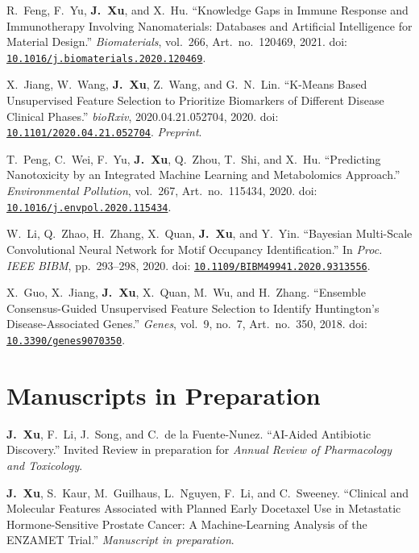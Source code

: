 \documentclass[10pt,a4paper]{article}
\begin{document}
\begin{enumerate}[label={[\arabic*]}, before={\interlinepenalty=10000}]
\item
R.~Feng, F.~Yu, \textbf{J.~Xu}, and X.~Hu.
``Knowledge Gaps in Immune Response and Immunotherapy Involving Nanomaterials: Databases and Artificial Intelligence for Material Design.''
\textit{Biomaterials}, vol.~266, Art.~no.~120469, 2021.
doi: \href{https://doi.org/10.1016/j.biomaterials.2020.120469}{\nolinkurl{10.1016/j.biomaterials.2020.120469}}.

\item
X.~Jiang, W.~Wang, \textbf{J.~Xu}, Z.~Wang, and G.~N.~Lin.
``K-Means Based Unsupervised Feature Selection to Prioritize Biomarkers of Different Disease Clinical Phases.''
\textit{bioRxiv}, 2020.04.21.052704, 2020.
doi: \href{https://doi.org/10.1101/2020.04.21.052704}{\nolinkurl{10.1101/2020.04.21.052704}}. \textit{Preprint}.

\item
T.~Peng, C.~Wei, F.~Yu, \textbf{J.~Xu}, Q.~Zhou, T.~Shi, and X.~Hu.
``Predicting Nanotoxicity by an Integrated Machine Learning and Metabolomics Approach.''
\textit{Environmental Pollution}, vol.~267, Art.~no.~115434, 2020.
doi: \href{https://doi.org/10.1016/j.envpol.2020.115434}{\nolinkurl{10.1016/j.envpol.2020.115434}}.

\item
W.~Li, Q.~Zhao, H.~Zhang, X.~Quan, \textbf{J.~Xu}, and Y.~Yin.
``Bayesian Multi-Scale Convolutional Neural Network for Motif Occupancy Identification.''
In \textit{Proc. IEEE BIBM}, pp.~293--298, 2020.
doi: \href{https://doi.org/10.1109/BIBM49941.2020.9313556}{\nolinkurl{10.1109/BIBM49941.2020.9313556}}.

\item
X.~Guo, X.~Jiang, \textbf{J.~Xu}, X.~Quan, M.~Wu, and H.~Zhang.
``Ensemble Consensus-Guided Unsupervised Feature Selection to Identify Huntington's Disease-Associated Genes.''
\textit{Genes}, vol.~9, no.~7, Art.~no.~350, 2018.
doi: \href{https://doi.org/10.3390/genes9070350}{\nolinkurl{10.3390/genes9070350}}.

\end{enumerate}

\section{Manuscripts in Preparation}
\begin{enumerate}[label={[\arabic*]}, before={\interlinepenalty=10000}]

\item
\textbf{J.~Xu}, F.~Li, J.~Song, and C.~de la Fuente-Nunez.
``AI-Aided Antibiotic Discovery.''
Invited Review in preparation for \textit{Annual Review of Pharmacology and Toxicology}.

\item
\textbf{J.~Xu}, S.~Kaur, M.~Guilhaus, L.~Nguyen, F.~Li, and C.~Sweeney.
``Clinical and Molecular Features Associated with Planned Early Docetaxel Use in Metastatic Hormone-Sensitive Prostate Cancer: A Machine-Learning Analysis of the ENZAMET Trial.''
\textit{Manuscript in preparation}.


\end{enumerate}
\end{document}
